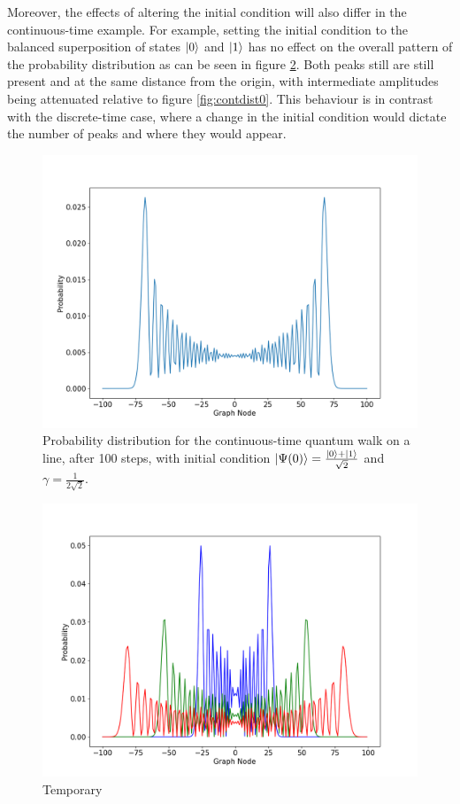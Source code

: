\documentclass[../../dissertation.tex]{subfiles}
\begin{document}
Moreover, the effects of altering the initial condition will also differ in the continuous-time example. For example, setting the initial condition to the balanced superposition of states $\ket{0}$ and $\ket{1}$ has no effect on the overall pattern of the probability distribution as can be seen in figure \ref{fig:contdist2}. Both peaks still are still present and at the same distance from the origin, with intermediate amplitudes being attenuated relative to figure \ref{fig:contdist0}. This behaviour is in contrast with the discrete-time case, where a change in the initial condition would dictate the number of peaks and where they would appear.

\begin{figure}[!h]
	\centering
	\includegraphics[scale=0.40]{img/ContQuantumWalk/ctqwSingleSup.png}
	\caption{Probability distribution for the continuous-time quantum walk on a line, after 100 steps, with initial condition $\ket{\Psi(0)}=\frac{\ket{0}+\ket{1}}{\sqrt{2}}$ and $\gamma=\frac{1}{2\sqrt{2}}$.} 
	\label{fig:contdist2}
\end{figure}

\begin{figure}[!h]
	\centering
	\includegraphics[scale=0.40]{img/ContQuantumWalk/ctqwMultipleTime.png}
	\caption{Temporary} 
	\label{fig:contdist2}
\end{figure}


\clearpage
\end{document}
